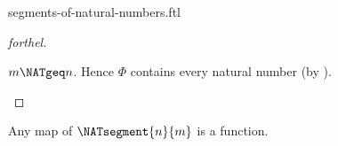 \documentclass{naproche-library}
\begin{document}
\begin{smodule}[title=Segments of the Natural Numbers]{segments-of-natural-numbers.ftl}
\begin{proof}[forthel]
\begin{case}{$m\NATgeq n$.}
    Hence $\Phi$ contains every natural number (by ).
  \end{case}
\end{proof}

\begin{proposition}[forthel,id=MapOfNatSegIsFunProp]
  Any map of $\NATsegment{n}{m}$ is a function.
\end{proposition}
\end{smodule}
\end{document}
